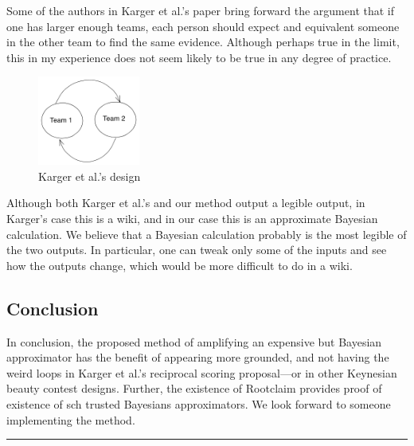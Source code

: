 \documentclass[]{article}
\begin{document}
Some of the authors in Karger et al.'s paper bring forward the argument
that if one has larger enough teams, each person should expect and
equivalent someone in the other team to find the same evidence. Although
perhaps true in the limit, this in my experience does not seem likely to
be true in any degree of practice.

\begin{figure}
\centering
\includegraphics[width=0.3\textwidth,height=\textheight]{diagrams/amplification-diagram-2.png}
\caption{Karger et al.'s design}
\end{figure}

Although both Karger et al.'s and our method output a legible output, in
Karger's case this is a wiki, and in our case this is an approximate
Bayesian calculation. We believe that a Bayesian calculation probably is
the most legible of the two outputs. In particular, one can tweak only
some of the inputs and see how the outputs change, which would be more
difficult to do in a wiki.

\hypertarget{conclusion}{%
\subsection{Conclusion}\label{conclusion}}

In conclusion, the proposed method of amplifying an expensive but
Bayesian approximator has the benefit of appearing more grounded, and
not having the weird loops in Karger et al.'s reciprocal scoring
proposal---or in other Keynesian beauty contest designs. Further, the
existence of Rootclaim provides proof of existence of sch trusted
Bayesians approximators. We look forward to someone implementing the
method.

\begin{center}\rule{0.5\linewidth}{0.5pt}\end{center}
\end{document}
